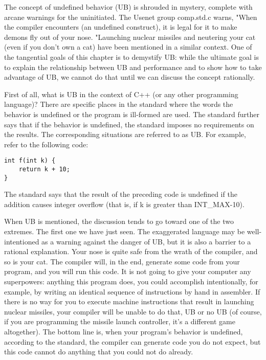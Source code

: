 The concept of undefined behavior (UB) is shrouded in mystery, complete with arcane warnings for the uninitiated. The Usenet group comp.std.c warns, "When the compiler encounters (an undefined construct), it is legal for it to make demons fly out of your nose. "Launching nuclear missiles and neutering your cat (even if you don't own a cat) have been mentioned in a similar context. One of the tangential goals of this chapter is to demystify UB: while the ultimate goal is to explain the relationship between UB and performance and to show how to take advantage of UB, we cannot do that until we can discuss the concept rationally.

First of all, what is UB in the context of C++ (or any other programming language)? There are specific places in the standard where the words the behavior is undefined or the program is ill-formed are used. The standard further says that if the behavior is undefined, the standard imposes no requirements on the results. The corresponding situations are referred to as UB. For example, refer to the following code:

\begin{lstlisting}[style=styleCXX]
int f(int k) {
	return k + 10;
}
\end{lstlisting}

The standard says that the result of the preceding code is undefined if the addition causes integer overflow (that is, if k is greater than INT\_MAX-10).

When UB is mentioned, the discussion tends to go toward one of the two extremes. The first one we have just seen. The exaggerated language may be well-intentioned as a warning against the danger of UB, but it is also a barrier to a rational explanation. Your nose is quite safe from the wrath of the compiler, and so is your cat. The compiler will, in the end, generate some code from your program, and you will run this code. It is not going to give your computer any superpowers: anything this program does, you could accomplish intentionally, for example, by writing an identical sequence of instructions by hand in assembler. If there is no way for you to execute machine instructions that result in launching nuclear missiles, your compiler will be unable to do that, UB or no UB (of course, if you are programming the missile launch controller, it's a different game altogether). The bottom line is, when your program's behavior is undefined, according to the standard, the compiler can generate code you do not expect, but this code cannot do anything that you could not do already.

